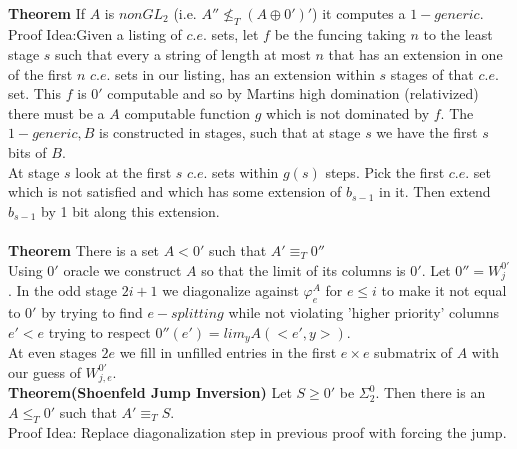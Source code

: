 \documentclass{article}
\begin{document}
   \\
   \textbf{Theorem} If $A$ is $non GL_2$ (i.e. $A'' \not \leq_T(A\oplus 0')'$) it computes a $1-generic$.
   \\ Proof Idea:Given a listing of $c.e.$ sets, let $f$ be the funcing taking $n$ to the least stage $s$ such that every a string of length at most $n$ that has an extension in one of the first $n$ $c.e.$ sets in our listing,  has an extension within $s$ stages of that $c.e.$ set. This $f$ is $0'$ computable and so by Martins high domination (relativized) there must be a $A$ computable function $g$ which is not dominated by $f$. The $1-generic, B$ is constructed in stages, such that at stage $s$ we have the first $s$ bits of $B$. \\
   At stage $s$ look at the first $s$ $c.e.$ sets within $g(s)$ steps. Pick the first $c.e.$ set which is not satisfied and which has some extension of $b_{s-1}$ in it. Then extend $b_{s-1}$ by 1 bit along this extension. \\
   \\
   \textbf{Theorem} There is a set $A < 0'$ such that $A' \equiv_T0''$\\
   Using $0'$ oracle we construct $A$ so that the limit of its columns is $0'$. Let $0'' = W_j^{0'}$. In the odd stage $2i+1$ we diagonalize against $\varphi_e^A $ for $e\leq i$ to make it not equal to $0'$ by trying to find $e-splitting$ while not violating 'higher priority' columns $e'<e$ trying to respect $0''(e') = lim_y A(<e',y>)$.\\
   At even stages $2e$ we fill in unfilled entries in the first $e\times e$ submatrix of $A$ with our guess of $W_{j,e}^{0'}$.
   \\
   \textbf{Theorem(Shoenfeld Jump Inversion)} Let $S\geq 0'$ be $\Sigma^0_2$. Then there is an $A\leq_T 0'$ such that $A' \equiv_T S$.
   \\ Proof Idea: Replace diagonalization step in previous proof with forcing the jump.
   \newpage
\end{document}
